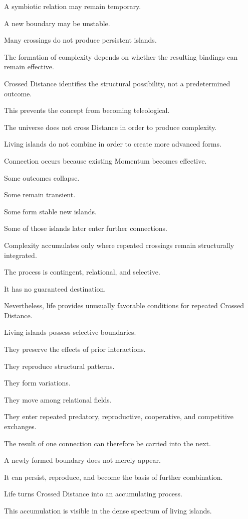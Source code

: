A symbiotic relation may remain temporary.

A new boundary may be unstable.

Many crossings do not produce persistent islands.

The formation of complexity depends on whether the resulting bindings can remain effective.

Crossed Distance identifies the structural possibility, not a predetermined outcome.

This prevents the concept from becoming teleological.

The universe does not cross Distance in order to produce complexity.

Living islands do not combine in order to create more advanced forms.

Connection occurs because existing Momentum becomes effective.

Some outcomes collapse.

Some remain transient.

Some form stable new islands.

Some of those islands later enter further connections.

Complexity accumulates only where repeated crossings remain structurally integrated.

The process is contingent, relational, and selective.

It has no guaranteed destination.

Nevertheless, life provides unusually favorable conditions for repeated Crossed Distance.

Living islands possess selective boundaries.

They preserve the effects of prior interactions.

They reproduce structural patterns.

They form variations.

They move among relational fields.

They enter repeated predatory, reproductive, cooperative, and competitive exchanges.

The result of one connection can therefore be carried into the next.

A newly formed boundary does not merely appear.

It can persist, reproduce, and become the basis of further combination.

Life turns Crossed Distance into an accumulating process.

This accumulation is visible in the dense spectrum of living islands.

